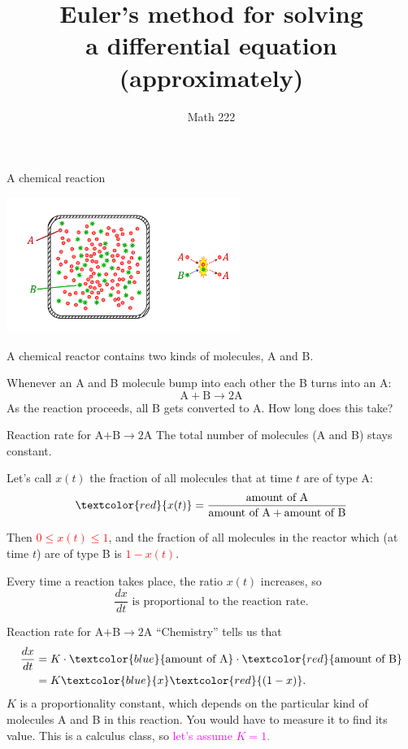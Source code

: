 \documentclass{beamer}
\title[diffeqs and Euler's method]{Euler's method for solving\\
a differential equation\\
(approximately)}
\author{Math 222}
\institute{Department of Mathematics, UW - Madison}
\begin{document}
\frame{\titlepage}

\begin{frame}{A chemical reaction}
  \centerline{\includegraphics[width=3in]{02ABreaction.pdf}}

  A chemical reactor contains two kinds of molecules, A and B.\pause

  Whenever an A and B molecule bump into each other the B turns into an A:
  \[
  \text{A} + \text{B} \longrightarrow 2\text{A}
  \]\pause
  As the reaction proceeds, all B gets converted to A.  How long does this
  take?
\end{frame}
\begin{frame}{Reaction rate for A$+$B$\longrightarrow2$A}
  The total number of molecules (A and B) stays constant.\pause

  Let's call $x(t)$ the fraction of all molecules that at
  time $t$ are of type A:
  \[
  \textcolor{red}{x(t)} = \frac{\text{amount of A}}
  {\text{amount of A} + \text{amount of B}}
  \]\pause

  Then \textcolor{red}{$0\leq x(t) \leq 1$}, and the fraction of all
  molecules in the reactor which (at time $t$) are of type B is
  \textcolor{red}{$1-x(t)$}.\pause

  Every time a reaction takes place, the ratio $x(t)$ increases, so
  \[
  \frac{dx} {dt} \text{ is proportional to the reaction rate.}
  \]
\end{frame}

\begin{frame}{Reaction rate for A$+$B$\longrightarrow2$A}
  ``Chemistry'' tells us that
  \begin{align*}
    \frac{dx} {dt}
    &= K\cdot \textcolor{blue}{\text{amount of A}}\cdot
    \textcolor{red}{\text{amount of B}} \\
    &= K \textcolor{blue}{x}\textcolor{red}{(1-x)}.
  \end{align*}\pause
  $K$ is a proportionality constant, which depends on the particular kind
  of molecules A and B in this reaction.  You would have to measure it to
  find its value.\pause
  This is a calculus class, so \textcolor{magenta}{let's assume $K=1$.}
\end{frame}
\end{document}
